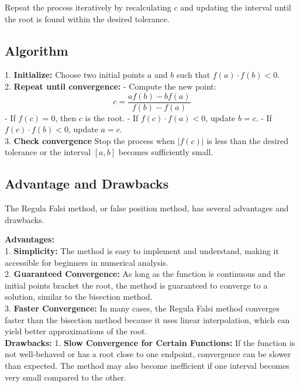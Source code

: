 \documentclass[12pt,a4paper]{article}
\begin{document}
	Repeat the process iteratively by recalculating \( c \) and updating the interval until the root is found within the desired tolerance.
	
	
	\subsection{Algorithm}
	1. \textbf{Initialize:} Choose two initial points \( a \) and \( b \) such that \( f(a) \cdot f(b) < 0 \). \\
	
	
	2. \textbf{Repeat until convergence:}
	- Compute the new point:
	\[
	c = \frac{a f(b) - b f(a)}{f(b) - f(a)}
	\]
	- If \( f(c) = 0 \), then \( c \) is the root.
	- If \( f(c) \cdot f(a) < 0 \), update \( b = c \).
	- If \( f(c) \cdot f(b) < 0 \), update \( a = c \).\\
	
	3. \textbf{Check convergence} Stop the process when \( |f(c)| \) is less than the desired tolerance or the interval \([a, b]\) becomes sufficiently small.
	
	
	\subsection{Advantage and Drawbacks}
	The Regula Falsi method, or false position method, has several advantages and drawbacks. 
	
	\textbf{Advantages:} \vspace{0.5cm} \\
	1. \textbf{Simplicity:} The method is easy to implement and understand, making it accessible for beginners in numerical analysis.\\
	
	2. \textbf{Guaranteed Convergence:} As long as the function is continuous and the initial points bracket the root, the method is guaranteed to converge to a solution, similar to the bisection method. \\ 
	
	3. \textbf{Faster Convergence:} In many cases, the Regula Falsi method converges faster than the bisection method because it uses linear interpolation, which can yield better approximations of the root.\\
	
	\textbf{Drawbacks:} \vspace{0.5cm}
	1. \textbf{Slow Convergence for Certain Functions:} If the function is not well-behaved or has a root close to one endpoint, convergence can be slower than expected. The method may also become inefficient if one interval becomes very small compared to the other.\\
	
\end{document}
